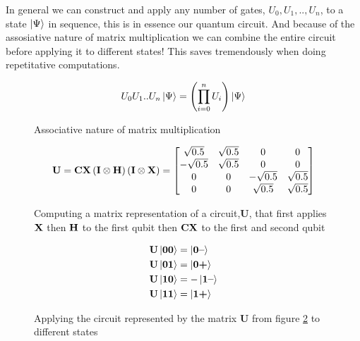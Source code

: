 \vspace{\baselineskip}
\noindent
In general we can construct and apply any number of gates, $U_0,U_1,..,U_n$, to a state $\ket{\Psi}$ in sequence, this is in essence our quantum circuit. 
And because of the assosiative nature of matrix multiplication we can combine the entire circuit before applying it to different states! 
This saves tremendously when doing repetitative computations.
\begin{figure}[H]
    \centering
    \begin{gather*}
        U_0 U_1 .. U_n \ket{\Psi} = \left(\prod_{i=0}^n U_i\right) \ket{\Psi}\\
    \end{gather*}
    \caption{Associative nature of matrix multiplication}
    \label{fig:assosiative}
\end{figure}

\begin{figure}[H]
    \centering
    \begin{align*}
        \mathbf{U}=\mathbf{CX}  \left(\mathbf{I}\otimes\mathbf{H}\right) \left(\mathbf{I}\otimes\mathbf{X}\right)        =
        \begin{bmatrix}
            \sqrt{0.5}  &  \sqrt{0.5} & 0 & 0 \\
            -\sqrt{0.5} &  \sqrt{0.5} & 0 & 0 \\
            0 & 0 & -\sqrt{0.5} & \sqrt{0.5} \\
            0 & 0 & \sqrt{0.5}  & \sqrt{0.5} \\
        \end{bmatrix}
    \end{align*}
    \caption{Computing a matrix representation of a circuit,$\mathbf{U}$, that first applies $\mathbf{X}$ then $\mathbf{H}$ to the first qubit then $\mathbf{CX}$ to the first and second qubit}
    \label{fig:circuit_matrix}
\end{figure}
\begin{figure}[H]
    \begin{align*}
        \mathbf{U}\ket{\mathbf{0}\mathbf{0}}&=\ket{\mathbf{0}\textbf{--}}\\
        \mathbf{U}\ket{\mathbf{0}\mathbf{1}}&=\ket{\mathbf{0}\textbf{+}}\\
        \mathbf{U}\ket{\mathbf{1}\mathbf{0}}&=-\ket{\mathbf{1}\textbf{--}}\\
        \mathbf{U}\ket{\mathbf{1}\mathbf{1}}&=\ket{\mathbf{1}\textbf{+}}
    \end{align*}
    \caption{Applying the circuit represented by the matrix $\mathbf{U}$ from figure \ref{fig:circuit_matrix} to different states}
    \label{fig:applying_circuit}
\end{figure}


